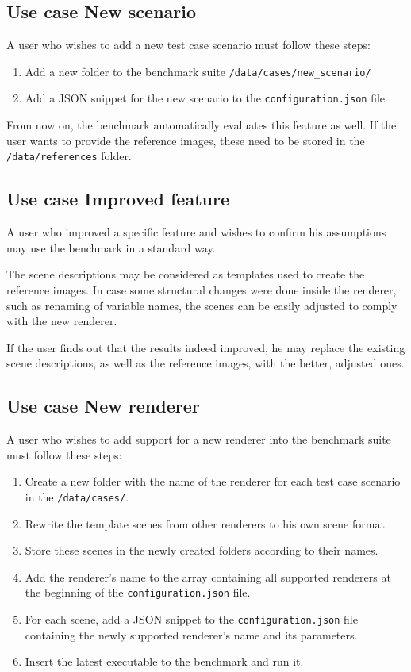 \subsection{Use case New scenario}

A user who wishes to add a new test case scenario must follow these steps:

\begin{enumerate}
	\item Add a new folder to the benchmark suite \texttt{/data/cases/new\_scenario/}
	\item Add a JSON snippet for the new scenario to the \texttt{configuration.json} file
\end{enumerate}

From now on, the benchmark automatically evaluates this feature as well. If the user wants to provide the reference images, these need to be stored in the \texttt{/data/references} folder.

\subsection{Use case Improved feature}

A user who improved a specific feature and wishes to confirm his assumptions may use the benchmark in a standard way.

The scene descriptions may be considered as templates used to create the reference images. In case some structural changes were done inside the renderer, such as renaming of variable names, the scenes can be easily adjusted to comply with the new renderer.

If the user finds out that the results indeed improved, he may replace the existing scene descriptions, as well as the reference images, with the better, adjusted ones.

\subsection{Use case New renderer}

A user who wishes to add support for a new renderer into the benchmark suite must follow these steps:

\begin{enumerate}
	\item Create a new folder with the name of the renderer for each test case scenario in the \texttt{/data/cases/}.
	\item Rewrite the template scenes from other renderers to his own scene format.
	\item Store these scenes in the newly created folders according to their names.
	\item Add the renderer's name to the array containing all supported renderers at the beginning of the  \texttt{configuration.json} file.
	\item For each scene, add a JSON snippet to the \texttt{configuration.json} file containing the newly supported renderer's name and its parameters.
	\item Insert the latest executable to the benchmark and run it.
\end{enumerate}

